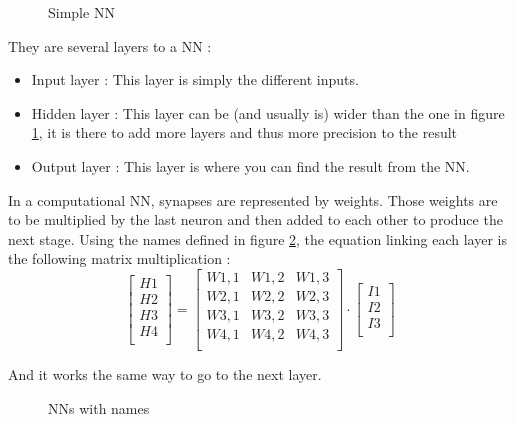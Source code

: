 \begin{figure}[h!]
    \centering
    
    \caption{Simple \acl{NN}}
    \label{fig:snn}
\end{figure}



They are several layers to a \ac{NN} : 
\begin{itemize}
    \item Input layer : This layer is simply the different inputs.
    \item Hidden layer : This layer can be (and usually is) wider than the one in figure \ref{fig:snn}, it is there to add more layers and thus more precision to the result
    \item Output layer : This layer is where you can find the result from the \ac{NN}.
\end{itemize}

In a computational \ac{NN}, synapses are represented by weights. Those weights are to be multiplied by the last neuron and then added to each other to produce the next stage. Using the names defined in figure \ref{fig:nn_explained}, the equation linking each layer is the following matrix multiplication : 
\begin{equation}
    \begin{bmatrix}
    H1\\ H2\\ H3\\ H4\\
    \end{bmatrix}
    =
    \begin{bmatrix}
        W1,1 & W1,2 & W1,3\\
        W2,1 & W2,2 & W2,3\\
        W3,1 & W3,2 & W3,3\\
        W4,1 & W4,2 & W4,3\\
    \end{bmatrix}
    \cdot
    \begin{bmatrix}
        I1\\ I2\\ I3\\
    \end{bmatrix}
\end{equation}

And it works the same way to go to the next layer.

\begin{figure}[h!]
    \centering
    
    \caption{\aclp{NN} with names}
    \label{fig:nn_explained}
\end{figure}

